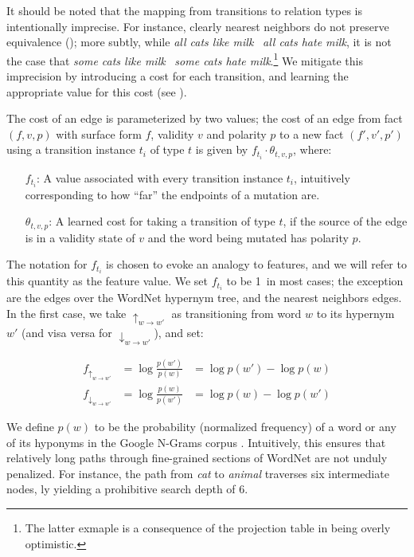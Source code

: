It should be noted that the mapping from transitions to relation
  types is intentionally imprecise.
For instance, clearly nearest neighbors do not preserve equivalence
  (\equivalent); more subtly, while
  \textit{all cats like milk} \alternate\ \textit{all cats hate milk},
  it is not the case that
  \textit{some cats like milk} \alternate\ \textit{some cats hate milk}.\footnote{
    The latter exmaple is a consequence of the projection table in
     being overly optimistic.
  }
We mitigate this imprecision by introducing a cost for each transition,
  and learning the appropriate value for this cost
  (see ).

The cost of an edge is parameterized by two values; the cost of an edge
  from fact $(f,v,p)$ with surface form $f$, validity
  $v$ and polarity $p$ to a new fact $(f',v',p')$ using a transition
  instance $t_i$ of type $t$ is given by
  $f_{t_i} \cdot \theta_{t,v,p}$, where:

\begin{itemize}
  \indentitem\item[$f_{t_i}$:]
    A value associated with every transition instance $t_i$, intuitively
      corresponding to how ``far'' the endpoints of a mutation are.
  \indentitem\item[$\theta_{t,v,p}$:]
    A learned cost for taking a transition of type $t$, if the source
    of the edge is in a validity state of $v$ and the word being mutated
    has polarity $p$.
\end{itemize}

The notation for $f_{t_i}$ is chosen to evoke an analogy to features,
  and we will refer to this quantity as the feature value.
We set $f_{t_i}$ to be 1\ in most cases;
  the exception are the edges over the WordNet hypernym tree,
  and the nearest neighbors edges.
In the first case, we take $\uparrow_{w \rightarrow w'}$ as transitioning
  from word $w$ to its hypernym $w'$ (and visa versa for
  $\downarrow_{w \rightarrow w'}$), and set:

\begin{align*}
  f_{\uparrow_{w \rightarrow w'}}   &= \log \frac{p(w')}{p(w)} &= \log p(w') - \log p(w) \\
  f_{\downarrow_{w \rightarrow w'}} &= \log \frac{p(w)}{p(w')} &= \log p(w) - \log p(w')
\end{align*}

We define $p(w)$ to be the probability (normalized frequency)
  of a word or any of its hyponyms in the Google N-Grams corpus
  \cite{key:2006brants-ngrams}.
Intuitively, this ensures that relatively long paths through fine-grained
  sections of WordNet are not unduly penalized.
For instance, the path from \textit{cat} to \textit{animal} traverses
  six intermediate nodes, \naive ly yielding a prohibitive
  search depth of 6.


